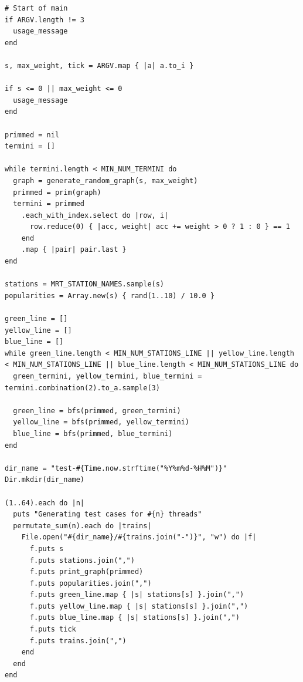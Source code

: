 \documentclass[a4paper,12pt]{article}
\begin{document}
\begin{verbatim}
# Start of main
if ARGV.length != 3
  usage_message
end

s, max_weight, tick = ARGV.map { |a| a.to_i }

if s <= 0 || max_weight <= 0
  usage_message
end

primmed = nil
termini = []

while termini.length < MIN_NUM_TERMINI do
  graph = generate_random_graph(s, max_weight)
  primmed = prim(graph)
  termini = primmed
    .each_with_index.select do |row, i|
      row.reduce(0) { |acc, weight| acc += weight > 0 ? 1 : 0 } == 1
    end
    .map { |pair| pair.last }
end

stations = MRT_STATION_NAMES.sample(s)
popularities = Array.new(s) { rand(1..10) / 10.0 }

green_line = []
yellow_line = []
blue_line = []
while green_line.length < MIN_NUM_STATIONS_LINE || yellow_line.length < MIN_NUM_STATIONS_LINE || blue_line.length < MIN_NUM_STATIONS_LINE do
  green_termini, yellow_termini, blue_termini = termini.combination(2).to_a.sample(3)

  green_line = bfs(primmed, green_termini)
  yellow_line = bfs(primmed, yellow_termini)
  blue_line = bfs(primmed, blue_termini)
end

dir_name = "test-#{Time.now.strftime("%Y%m%d-%H%M")}"
Dir.mkdir(dir_name)

(1..64).each do |n|
  puts "Generating test cases for #{n} threads"
  permutate_sum(n).each do |trains|
    File.open("#{dir_name}/#{trains.join("-")}", "w") do |f|
      f.puts s
      f.puts stations.join(",")
      f.puts print_graph(primmed)
      f.puts popularities.join(",")
      f.puts green_line.map { |s| stations[s] }.join(",")
      f.puts yellow_line.map { |s| stations[s] }.join(",")
      f.puts blue_line.map { |s| stations[s] }.join(",")
      f.puts tick
      f.puts trains.join(",")
    end
  end
end

	\end{verbatim}
\end{document}
